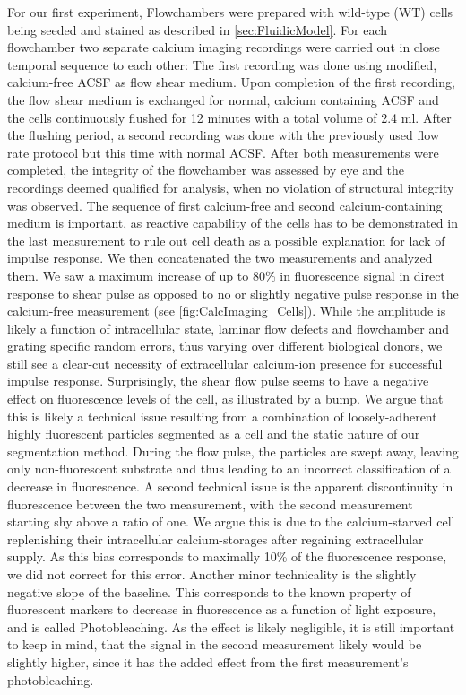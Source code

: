 For our first experiment, Flowchambers were prepared with wild-type (WT) cells being seeded and stained as described in \vref{sec:FluidicModel}. For each flowchamber two separate calcium imaging recordings were carried out in close temporal sequence to each other: The first recording was done using modified, calcium-free ACSF as flow shear medium. Upon completion of the first recording, the flow shear medium is exchanged for normal, calcium containing ACSF and the cells continuously flushed for 12 minutes with a total volume of 2.4 ml. After the flushing period, a second recording was done with the previously used flow rate protocol but this time with normal ACSF. After both measurements were completed, the integrity of the flowchamber was assessed by eye and the recordings deemed qualified for analysis, when no violation of structural integrity was observed. The sequence of first calcium-free and second calcium-containing medium is important, as reactive capability of the cells has to be demonstrated in the last measurement to rule out cell death as a possible explanation for lack of impulse response. We then concatenated the two measurements and analyzed them. We saw a maximum increase of up to 80\% in fluorescence signal in direct response to shear pulse as opposed to no or slightly negative pulse response in the calcium-free measurement (see \ref{fig:CalcImaging_Cells}). While the amplitude is likely a function of intracellular state, laminar flow defects and flowchamber and grating specific random errors, thus varying over different biological donors, we still see a clear-cut necessity of extracellular calcium-ion presence for successful impulse response. Surprisingly, the shear flow pulse seems to have a negative effect on fluorescence levels of the cell, as illustrated by a bump. We argue that this is likely a technical issue resulting from a combination of loosely-adherent highly fluorescent particles segmented as a cell and the static nature of our segmentation method. During the flow pulse, the particles are swept away, leaving only non-fluorescent substrate and thus leading to an incorrect classification of a decrease in fluorescence. A second technical issue is the apparent discontinuity in fluorescence between the two measurement, with the second measurement starting shy above a ratio of one. We argue this is due to the calcium-starved cell replenishing their intracellular calcium-storages after regaining extracellular supply. As this bias corresponds to maximally 10\% of the fluorescence response, we did not correct for this error. Another minor technicality is the slightly negative slope of the baseline. This corresponds to the known property of fluorescent markers to decrease in fluorescence as a function of light exposure, and is called Photobleaching. As the effect is likely negligible, it is still important to keep in mind, that the signal in the second measurement likely would be slightly higher, since it has the added effect from the first measurement's photobleaching.


